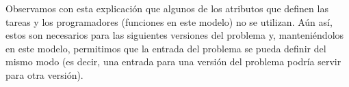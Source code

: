 Observamos con esta explicación que algunos de los atributos que definen las 
tareas y los programadores (funciones en este modelo) no se utilizan. Aún así, 
estos son necesarios para las siguientes versiones del problema y, 
manteniéndolos en este modelo, permitimos que la entrada del problema se pueda 
definir del mismo modo (es decir, una entrada para una versión del problema 
podría servir para otra versión).



